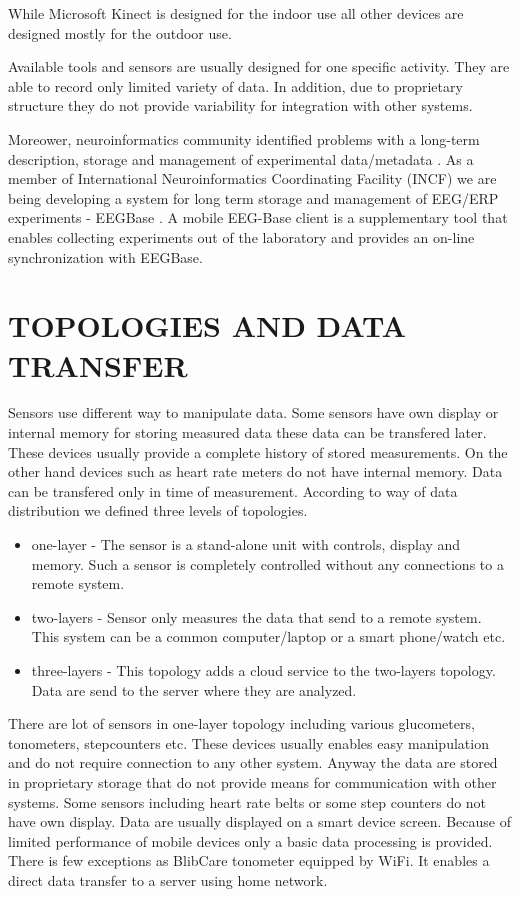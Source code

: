 \documentclass[a4paper,twoside]{article}
\begin{document}
While Microsoft Kinect is designed for the indoor use all other devices are designed mostly for the outdoor use. 

Available tools and sensors are usually designed for one specific activity. They are able to record only limited variety of data. In addition, due to proprietary structure they do not provide variability for integration with other systems. 

Moreower, neuroinformatics community identified problems with a long-term description, storage and management of experimental data/metadata \cite{CRCNS}. As a member of International Neuroinformatics Coordinating Facility (INCF) \cite{INCF} we are being developing a system for long term storage and management of EEG/ERP experiments - EEGBase \cite{ISI:000306821100004}. A mobile EEG-Base client \cite{10.3389/conf.fninf.2013.09.00046} is a supplementary tool that enables collecting experiments out of the laboratory and provides an on-line synchronization with EEGBase.


\section{\uppercase{Topologies and Data Transfer}}
\label{topology_data_transfer}

\noindent 
Sensors use different way to manipulate data. Some sensors have own display or internal memory for storing measured data these data can be transfered later. These devices usually provide a complete history of stored measurements. On the other hand devices such as heart rate meters do not have internal memory. Data can be transfered only in time of measurement. According to way of data distribution we defined three levels of topologies.

\begin{itemize}
 \item one-layer - The sensor is a stand-alone unit with controls, display and memory. Such a sensor is completely controlled without any connections to a remote system.   
 \item two-layers - Sensor only measures the data that send to a remote system. This system can be a common computer/laptop or a smart phone/watch etc. 
 \item three-layers - This topology adds a cloud service to the two-layers topology. Data are send to the server where they are analyzed. 
\end{itemize}

There are lot of sensors in one-layer topology including various glucometers, tonometers, stepcounters etc. These devices usually enables easy manipulation and do not require connection to any other system. Anyway the data are stored in proprietary storage that do not provide means for communication with other systems. Some sensors including heart rate belts or some step counters do not have own display. Data are usually displayed on a smart device screen. Because of limited performance of mobile devices only a basic data processing is provided. There is few exceptions as BlibCare tonometer equipped by WiFi. It enables a direct data transfer to a server using home network. 
\end{document}
